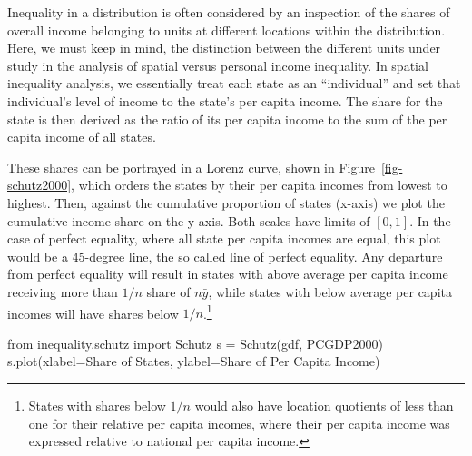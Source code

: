 \documentclass[
  a4paper, 
  twoside,
  final
]{article}
\newenvironment{Shaded}{\begin{snugshade}}{\end{snugshade}}
\newcommand{\ImportTok}[1]{\textcolor[rgb]{0.00,0.46,0.62}{#1}}
\newcommand{\NormalTok}[1]{\textcolor[rgb]{0.00,0.23,0.31}{#1}}
\newcommand{\OperatorTok}[1]{\textcolor[rgb]{0.37,0.37,0.37}{#1}}
\newcommand{\StringTok}[1]{\textcolor[rgb]{0.13,0.47,0.30}{#1}}
\begin{document}
Inequality in a distribution is often considered by an inspection of the
shares of overall income belonging to units at different locations
within the distribution. Here, we must keep in mind, the distinction
between the different units under study in the analysis of spatial
versus personal income inequality. In spatial inequality analysis, we
essentially treat each state as an ``individual'' and set that
individual's level of income to the state's per capita income. The share
for the state is then derived as the ratio of its per capita income to
the sum of the per capita income of all states.

These shares can be portrayed in a Lorenz curve, shown in
Figure~\ref{fig-schutz2000}, which orders the states by their per capita
incomes from lowest to highest. Then, against the cumulative proportion
of states (x-axis) we plot the cumulative income share on the y-axis.
Both scales have limits of \([0, 1]\). In the case of perfect equality,
where all state per capita incomes are equal, this plot would be a
45-degree line, the so called line of perfect equality. Any departure
from perfect equality will result in states with above average per
capita income receiving more than \(1/n\) share of \(n \bar{y}\), while
states with below average per capita incomes will have shares below
\(1/n\).\footnote{States with shares below \(1/n\) would also have
  location quotients of less than one for their relative per capita
  incomes, where their per capita income was expressed relative to
  national per capita income.}

\begin{Shaded}
\begin{Highlighting}[]
\ImportTok{from}\NormalTok{ inequality.schutz }\ImportTok{import}\NormalTok{ Schutz}
\NormalTok{s }\OperatorTok{=}\NormalTok{ Schutz(gdf, }\StringTok{\textquotesingle{}PCGDP2000\textquotesingle{}}\NormalTok{)}
\NormalTok{s.plot(xlabel}\OperatorTok{=}\StringTok{\textquotesingle{}Share of States\textquotesingle{}}\NormalTok{, ylabel}\OperatorTok{=}\StringTok{\textquotesingle{}Share of Per Capita Income\textquotesingle{}}\NormalTok{)}
\end{Highlighting}
\end{Shaded}
\end{document}
